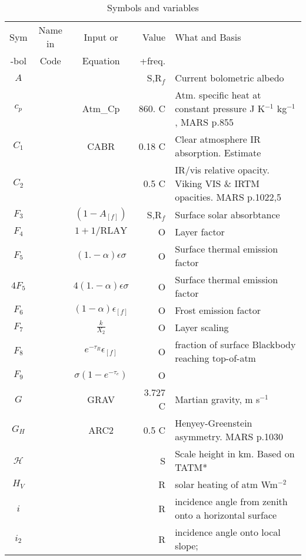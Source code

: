 \begin{table}[ht]
\caption{Symbols and variables}
\label{tab:sym}
\begin{center}
\begin{tabular}{ c c c r  l } \hline 
Sym   & Name in & Input or  & Value  & What and Basis \\  
-bol  & Code    & Equation  & +freq. &  \\  
\hline  
$A$   & \ct{AS} &   & S,R$_f$ & Current bolometric albedo\\
$c_p$   & \ct{ATMCP} & Atm\_Cp  & 860. C & Atm. specific heat at constant
pressure J K$^{-1}$ kg$^{-1}$, MARS p.855\\
$C_1$    & \ct{CABR}  & CABR  & 0.18 C & Clear atmosphere IR absorption. Estimate  \\
$C_2$    & \ct{TAURAT}&       & 0.5 C & IR/vis relative opacity. 
                                Viking  VIS \& IRTM opacities. MARS p.1022,5  \\
$F_3$  & \ct{FAC3}   & $ (1-A_{[f]}) $   &  S,R$_f$ & Surface solar absorbtance  \\ 
$F_4$  & \ct{FAC4}   & $1+1/\mathrm{RLAY} $   & O &  Layer factor \\
$F_5$  & \ct{FAC5}   & $ (1.-\alpha) \epsilon \sigma  $   & O & Surface thermal
emission factor    \\ 
$4 F_5$  & \ct{FAC45} & $  4 (1.-\alpha) \epsilon \sigma  $   & O & Surface thermal
emission factor  \\ 
$F_6$  & \ct{FAC6}   & $(1-\alpha ) \epsilon_{[f]} $  & O & Frost emission factor \\
$F_7$  & \ct{FAC7}   & $ \frac{k}{X_2}$    & O & Layer scaling \\
$F_8$  & \ct{FAC8}   & $e^{-\tau_R} \epsilon _{[f]}$    & O & fraction of surface
Blackbody reaching top-of-atm  \\
$F_9$  & \ct{FAC9}   & $\sigma (1-e^{-\tau_e}) $    & O &    \\
$G$   & \ct{GRAV} & GRAV  & 3.727 C & Martian gravity, m s$^{-1}$ \\
$G_H$      & \ct{G0}    & ARC2  & 0.5 C & Henyey-Greenstein asymmetry.  MARS p.1030 \\
$\mathcal{H}$   & \ct{SCALEH} &  &  S & Scale height in km. Based on TATM*\\
$H_V$   & \ct{ADGR} &   & R & solar heating of atm  Wm$^{-2}$\\
$i$   & \ct{} &   & R &  incidence angle from zenith onto a horizontal surface\\
$i_2$   & \ct{} &   & R &  incidence angle onto local slope;

\end{tabular}
\end{center}
\end{table}
